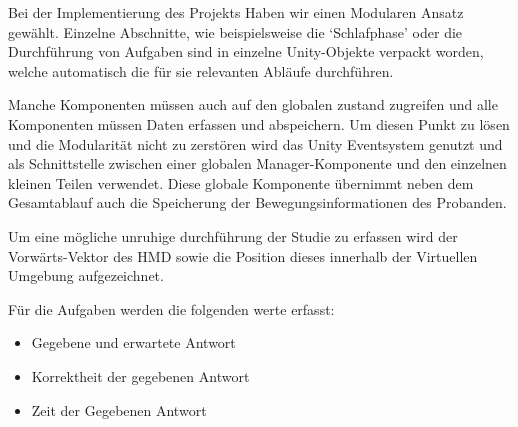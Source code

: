 Bei der Implementierung des Projekts Haben wir einen Modularen Ansatz gewählt. Einzelne Abschnitte, wie beispielsweise die `Schlafphase' oder die Durchführung von Aufgaben sind in einzelne Unity-Objekte verpackt worden, welche automatisch die für sie relevanten Abläufe durchführen. 

Manche Komponenten müssen auch auf den globalen zustand zugreifen und alle Komponenten müssen Daten erfassen und abspeichern. Um diesen Punkt zu lösen und die Modularität nicht zu zerstören wird das Unity Eventsystem genutzt und als Schnittstelle zwischen einer globalen Manager-Komponente und den einzelnen kleinen Teilen verwendet. 
Diese globale Komponente übernimmt neben dem Gesamtablauf auch die Speicherung der Bewegungsinformationen des Probanden. 

Um eine mögliche unruhige durchführung der Studie zu erfassen wird der Vorwärts-Vektor des HMD sowie die Position dieses innerhalb der Virtuellen Umgebung aufgezeichnet.

Für die Aufgaben werden die folgenden werte erfasst:
\begin{itemize}
    \item Gegebene und erwartete Antwort
    \item Korrektheit der gegebenen Antwort
    \item Zeit der Gegebenen Antwort
\end{itemize}
